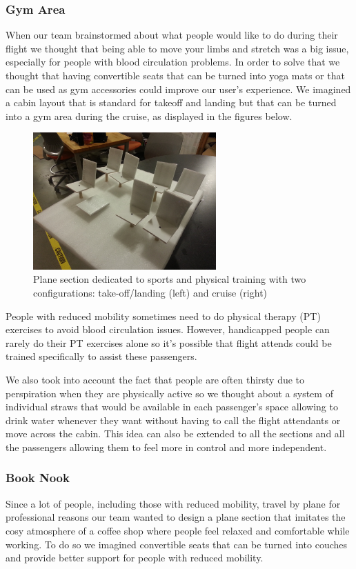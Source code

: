 \subsubsection{Gym Area}
When our team brainstormed about what people would like to do during their flight we thought that being able to move your limbs and stretch was a big issue, especially for people with blood circulation problems. In order to solve that we thought that having convertible seats that can be turned into yoga mats or that can be used as gym accessories could improve our user's experience. We imagined a cabin layout that is standard for takeoff and landing but that can be turned into a gym area during the cruise, as displayed in the figures below. \\

\begin{figure}[h]
  \centering
     \includegraphics[width=7cm]{images/20140116_172402.jpg}
   \caption{Plane section dedicated to sports and physical training with two configurations: take-off/landing (left) and cruise (right)}
  \label{fig:20140116_172402}
\end{figure}

People with reduced mobility sometimes need to do physical therapy (PT) exercises to avoid blood circulation issues. However, handicapped people can rarely do their PT exercises alone so it's possible that flight attends could be trained specifically to assist these passengers.

We also took into account the fact that people are often thirsty due to perspiration when they are physically active so we thought about a system of individual straws that would be available in each passenger's space allowing to drink water whenever they want without having to call the flight attendants or move across the cabin. This idea can also be extended to all the sections and all the passengers allowing them to feel more in control and more independent.

\subsubsection{Book Nook}
Since a lot of people, including those with reduced mobility, travel by plane for professional reasons our team wanted to design a plane section that imitates the cosy atmosphere of a coffee shop where people feel relaxed and comfortable while working.
To do so we imagined convertible seats that can be turned into couches and provide better support for people with reduced mobility. 

